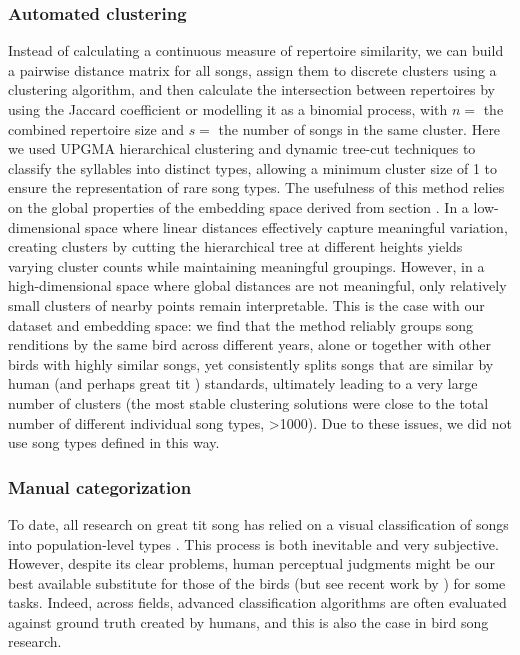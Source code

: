 \documentclass[9pt, twocolumn, twoside]{gsajnl}
\begin{document}
\subsubsection{Automated clustering}

Instead of calculating a continuous measure of repertoire similarity, we can build a pairwise distance matrix for all songs, assign them to discrete clusters using a clustering algorithm, and then calculate the intersection between repertoires by using the Jaccard coefficient or modelling it as a binomial process, with $n = $ the combined repertoire size and $s = $ the number of songs in the same cluster. Here we used UPGMA hierarchical clustering and dynamic tree-cut techniques to classify the syllables into distinct types, allowing a minimum cluster size of 1 to ensure the representation of rare song types. The usefulness of this method relies on the global properties of the embedding space derived from section . In a low-dimensional space where linear distances effectively capture meaningful variation, creating clusters by cutting the hierarchical tree at different heights yields varying cluster counts while maintaining meaningful groupings. However, in a high-dimensional space where global distances are not meaningful, only relatively small clusters of nearby points remain interpretable. This is the case with our dataset and embedding space: we find that the method reliably groups song renditions by the same bird across different years, alone or together with other birds with highly similar songs, yet consistently splits songs that are similar by human (and perhaps great tit \parencite{falls1982}) standards, ultimately leading to a very large number of clusters (the most stable clustering solutions were close to the total number of different individual song types, >1000). Due to these issues, we did not use song types defined in this way.

\subsubsection{Manual categorization}

To date, all research on great tit song has relied on a visual classification of songs into population-level types \parencite{baker1987, falls1982, fayet2014, hutfluss2022, mcgregor1982, mcgregor1981, mcgregor1982b}. This process is both inevitable and very subjective. However, despite its clear problems, human perceptual judgments might be our best available substitute for those of the birds (but see recent work by \cite{morfi2021, zandberg2022}) for some tasks. Indeed, across fields, advanced classification algorithms are often evaluated against ground truth created by humans, and this is also the case in bird song research.
\end{document}
